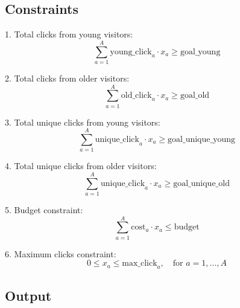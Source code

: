 \documentclass{article}
\begin{document}
\subsection*{Constraints}

1. Total clicks from young visitors:
\[
\sum_{a=1}^{A} \text{young\_click}_{a} \cdot x_a \geq \text{goal\_young}
\]

2. Total clicks from older visitors:
\[
\sum_{a=1}^{A} \text{old\_click}_{a} \cdot x_a \geq \text{goal\_old}
\]

3. Total unique clicks from young visitors:
\[
\sum_{a=1}^{A} \text{unique\_click}_{a} \cdot x_a \geq \text{goal\_unique\_young}
\]

4. Total unique clicks from older visitors:
\[
\sum_{a=1}^{A} \text{unique\_click}_{a} \cdot x_a \geq \text{goal\_unique\_old}
\]

5. Budget constraint:
\[
\sum_{a=1}^{A} \text{cost}_{a} \cdot x_a \leq \text{budget}
\]

6. Maximum clicks constraint:
\[
0 \leq x_a \leq \text{max\_click}_{a}, \quad \text{for } a = 1, \ldots, A
\]

\subsection*{Output}
\end{document}

